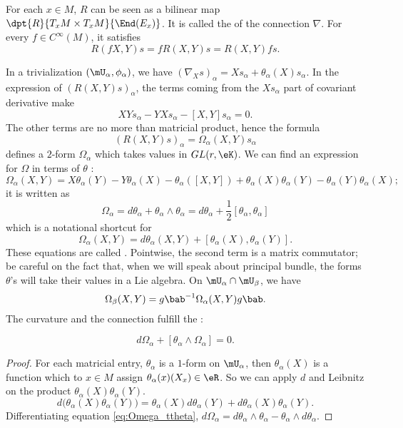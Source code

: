 For each $x\in M$, $R$ can be seen as a bilinear map $\dpt{R}{T_xM\times T_xM}{\End(E_x)}$. It is called the  of the connection $\nabla$. For every $f\in C^{\infty}(M)$, it satisfies
\[
 R(fX,Y)s=fR(X,Y)s=R(X,Y)fs.
\]
    

In a trivialization $(\mU_{\alpha},\phi_{\alpha})$, we have $(\nabla_Xs)_{\alpha}=Xs_{\alpha}+\theta_{\alpha}(X)s_{\alpha}$. In the expression of $(R(X,Y)s)_{\alpha}$, the terms coming from the $Xs_{\alpha}$ part of covariant derivative make
\[
  XYs_{\alpha}-YXs_{\alpha}-[X,Y]s_{\alpha}=0.
\]
The other terms are no more than matricial product, hence the formula
\begin{equation}
  (R(X,Y)s)_{\alpha}=\Omega_{\alpha}(X,Y)s_{\alpha}
\end{equation}
 defines a $2$-form $\Omega_{\alpha}$ which takes values in $GL(r,\eK)$. We can find an expression for $\Omega$ in terms of $\theta$ :
\[
  \Omega_{\alpha}(X,Y)=X\theta_{\alpha}(Y)-Y\theta_{\alpha}(X)-\theta_{\alpha}([X,Y])+\theta_{\alpha}(X)\theta_{\alpha}(Y)-\theta_{\alpha}(Y)\theta_{\alpha}(X);
\]
it is written as
\begin{equation}\label{eq:Omega_ttheta}
\Omega_{\alpha}=d\theta_{\alpha}+\theta_{\alpha}\wedge\theta_{\alpha}=d\theta_{\alpha}+\frac{1}{2}[\theta_{\alpha},\theta_{\alpha}]
\end{equation}
which is a notational shortcut for
\begin{equation}		\label{EaCurvdVVsq}
  \Omega_{\alpha}(X,Y)=d\theta_{\alpha}(X,Y)+[\theta_{\alpha}(X),\theta_{\alpha}(Y)].
\end{equation}
These equations are called . Pointwise, the second term is a matrix commutator; be careful on the fact that, when we will speak about principal bundle, the forms $\theta$'s will take their values in a Lie algebra. On $\mU_{\alpha}\cap\mU_{\beta}$, we have
\[
  \Omega_{\beta}(X,Y)=g\bab^{-1}\Omega_{\alpha}(X,Y)g\bab.
\]
The curvature and the connection fulfill the  :

\begin{lemma}
  \[
     d\Omega_{\alpha}+[\theta_{\alpha}\wedge\Omega_{\alpha}]=0.
  \]
\end{lemma}

\begin{proof}
For each matricial entry, $\theta_{\alpha}$ is a $1$-form on $\mU_{\alpha}$, then $\theta_{\alpha}(X)$ is a function which to $x\in M$ assign $\theta_{\alpha}(x)(X_x)\in\eR$. So we can apply $d$ and Leibnitz on the product $\theta_{\alpha}(X)\theta_{\alpha}(Y)$.
\[
 d\big(  \theta_{\alpha}(X)\theta_{\alpha}(Y)  \big)=\theta_{\alpha}(X)d\theta_{\alpha}(Y)+d\theta_{\alpha}(X)\theta_{\alpha}(Y).
\]
Differentiating equation \eqref{eq:Omega_ttheta}, $d\Omega_{\alpha}=d\theta_{\alpha}\wedge\theta_{\alpha}-\theta_{\alpha}\wedge d\theta_{\alpha}$. 
\end{proof}


